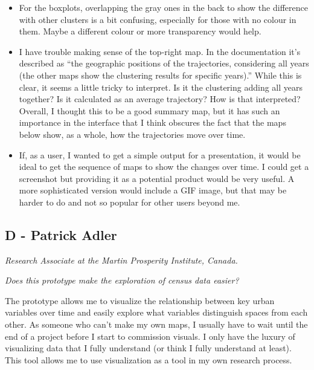 \documentclass[a4paper]{article}
\newcommand{\question}[1]{\smallskip\noindent\emph{#1}}
\begin{document}
\begin{itemize}
    \item{For the boxplots, overlapping the gray ones in the back to show the
            difference with other clusters is a bit confusing, especially for
            those with no colour in them. Maybe a different colour or more
            transparency would help. }

    \item{I have trouble making sense of the top-right map. In the documentation
            it’s described as “the geographic positions of the trajectories,
            considering all years (the other maps show the clustering results
            for specific years).” While this is clear, it seems a little tricky
            to interpret. Is it the clustering adding all years together? Is it
            calculated as an average trajectory? How is that interpreted?
            Overall, I thought this to be a good summary map, but it has such an
            importance in the interface that I think obscures the fact that the
            maps below show, as a whole, how the trajectories move over time.}

    \item{If, as a user, I wanted to get a simple output for a presentation, it
            would be ideal to get the sequence of maps to show the changes over
            time. I could get a screenshot but providing it as a potential
            product would be very useful. A more sophisticated version would
            include a GIF image, but that may be harder to do and not so popular
            for other users beyond me.}
\end{itemize}


\subsection{D - Patrick Adler}
\emph{Research Associate at the Martin Prosperity Institute, Canada.}

\question{Does this prototype make the exploration of census data easier?}

The prototype allows me to visualize the relationship between key urban
variables over time and easily explore  what variables distinguish spaces from
each other. As someone who can’t make my own maps, I usually have to wait until
the end of a project before I start to commission visuals. I only have the
luxury of visualizing data that I fully understand (or think I fully understand
at least).  This tool allows me to use visualization as a tool in my own
research process.  
\end{document}
